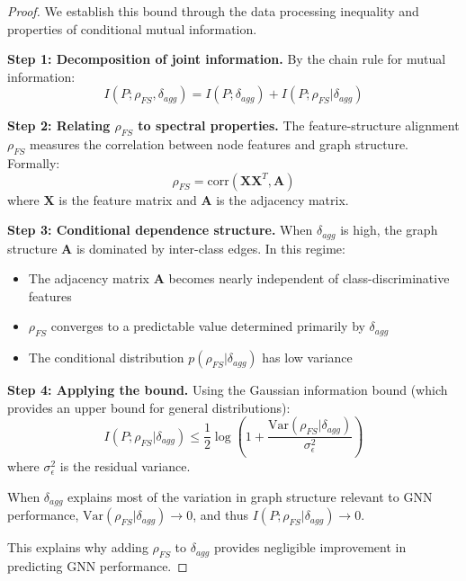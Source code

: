 \begin{proof}
We establish this bound through the data processing inequality and properties of conditional mutual information.

\textbf{Step 1: Decomposition of joint information.}
By the chain rule for mutual information:
\begin{equation}
I(P; \rho_{FS}, \delta_{agg}) = I(P; \delta_{agg}) + I(P; \rho_{FS} | \delta_{agg})
\end{equation}

\textbf{Step 2: Relating $\rho_{FS}$ to spectral properties.}
The feature-structure alignment $\rho_{FS}$ measures the correlation between node features and graph structure. Formally:
\begin{equation}
\rho_{FS} = \text{corr}(\mathbf{X}\mathbf{X}^T, \mathbf{A})
\end{equation}
where $\mathbf{X}$ is the feature matrix and $\mathbf{A}$ is the adjacency matrix.

\textbf{Step 3: Conditional dependence structure.}
When $\delta_{agg}$ is high, the graph structure $\mathbf{A}$ is dominated by inter-class edges. In this regime:
\begin{itemize}
    \item The adjacency matrix $\mathbf{A}$ becomes nearly independent of class-discriminative features
    \item $\rho_{FS}$ converges to a predictable value determined primarily by $\delta_{agg}$
    \item The conditional distribution $p(\rho_{FS} | \delta_{agg})$ has low variance
\end{itemize}

\textbf{Step 4: Applying the bound.}
Using the Gaussian information bound (which provides an upper bound for general distributions):
\begin{equation}
I(P; \rho_{FS} | \delta_{agg}) \leq \frac{1}{2}\log\left(1 + \frac{\text{Var}(\rho_{FS} | \delta_{agg})}{\sigma^2_{\epsilon}}\right)
\end{equation}
where $\sigma^2_{\epsilon}$ is the residual variance.

When $\delta_{agg}$ explains most of the variation in graph structure relevant to GNN performance, $\text{Var}(\rho_{FS} | \delta_{agg}) \to 0$, and thus $I(P; \rho_{FS} | \delta_{agg}) \to 0$.

This explains why adding $\rho_{FS}$ to $\delta_{agg}$ provides negligible improvement in predicting GNN performance.
\end{proof}

